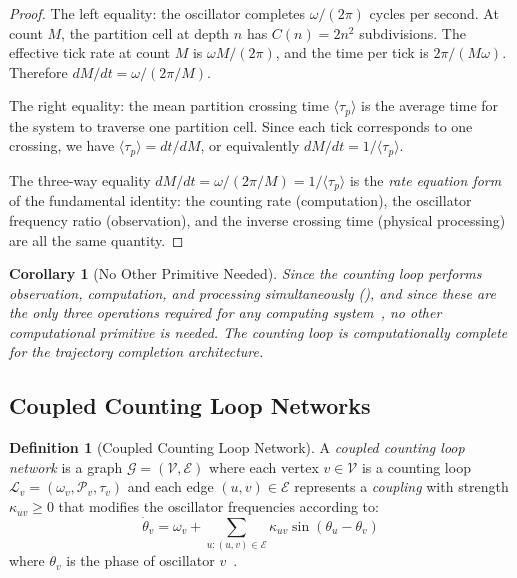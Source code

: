 \documentclass[twocolumn,10pt]{article}
\newtheorem{corollary}[theorem]{Corollary}
\theoremstyle{definition}
\newtheorem{definition}[theorem]{Definition}
\newcommand{\taup}{\tau_p}
\begin{document}
\begin{proof}
The left equality: the oscillator completes $\omega/(2\pi)$ cycles per second. At count $M$, the partition cell at depth $n$ has $C(n) = 2n^2$ subdivisions. The effective tick rate at count $M$ is $\omega M/(2\pi)$, and the time per tick is $2\pi/(M\omega)$. Therefore $dM/dt = \omega/(2\pi/M)$.

The right equality: the mean partition crossing time $\langle \taup \rangle$ is the average time for the system to traverse one partition cell. Since each tick corresponds to one crossing, we have $\langle \taup \rangle = dt/dM$, or equivalently $dM/dt = 1/\langle \taup \rangle$.

The three-way equality $dM/dt = \omega/(2\pi/M) = 1/\langle \taup \rangle$ is the \emph{rate equation form} of the fundamental identity: the counting rate (computation), the oscillator frequency ratio (observation), and the inverse crossing time (physical processing) are all the same quantity.
\end{proof}

\begin{corollary}[No Other Primitive Needed]
\label{cor:no-other-primitive}
Since the counting loop performs observation, computation, and processing simultaneously (), and since these are the only three operations required for any computing system~\cite{turing1936}, no other computational primitive is needed. The counting loop is \emph{computationally complete} for the trajectory completion architecture.
\end{corollary}

\subsection{Coupled Counting Loop Networks}

\begin{definition}[Coupled Counting Loop Network]
\label{def:coupled-network}
A \emph{coupled counting loop network} is a graph $\mathcal{G} = (\mathcal{V}, \mathcal{E})$ where each vertex $v \in \mathcal{V}$ is a counting loop $\mathcal{L}_v = (\omega_v, \mathcal{P}_v, \tau_v)$ and each edge $(u,v) \in \mathcal{E}$ represents a \emph{coupling} with strength $\kappa_{uv} \geq 0$ that modifies the oscillator frequencies according to:
\begin{equation}
\dot{\theta}_v = \omega_v + \sum_{u : (u,v) \in \mathcal{E}} \kappa_{uv} \sin(\theta_u - \theta_v)
\label{eq:kuramoto-coupling}
\end{equation}
where $\theta_v$ is the phase of oscillator $v$~\cite{kuramoto1984}.
\end{definition}
\end{document}
